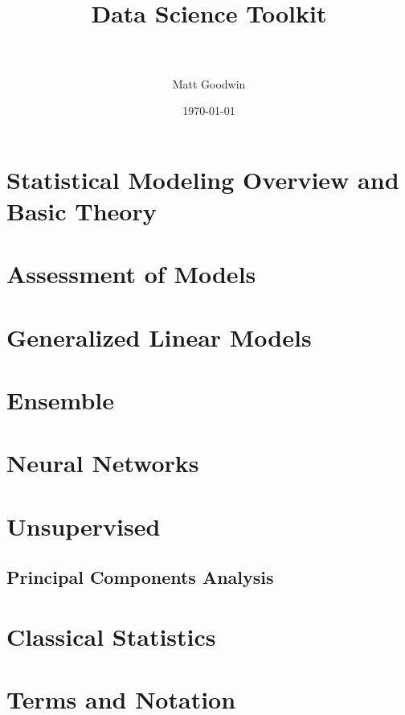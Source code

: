 \documentclass[paper=a4, fontsize=11pt]{scrartcl} %
\title{	
\normalfont \normalsize 
\horrule{0.5pt} \\[0.4cm] %
\huge Data Science Toolkit \\ %
\horrule{2pt} \\[0.5cm] %
}
\author{Matt Goodwin} %
\date{\normalsize\today} %
\numberwithin{equation}{section} %
\numberwithin{figure}{section} %
\numberwithin{table}{section} %
\begin{document}
\maketitle 

\tableofcontents
\newpage


\section{Statistical Modeling Overview and Basic Theory}


\section{Assessment of Models}


\section{Generalized Linear Models}


\section{Ensemble}


\section{Neural Networks}


\section{Unsupervised}
\subsection{Principal Components Analysis}

\section{Classical Statistics}





\section{Terms and Notation}
\end{document}
